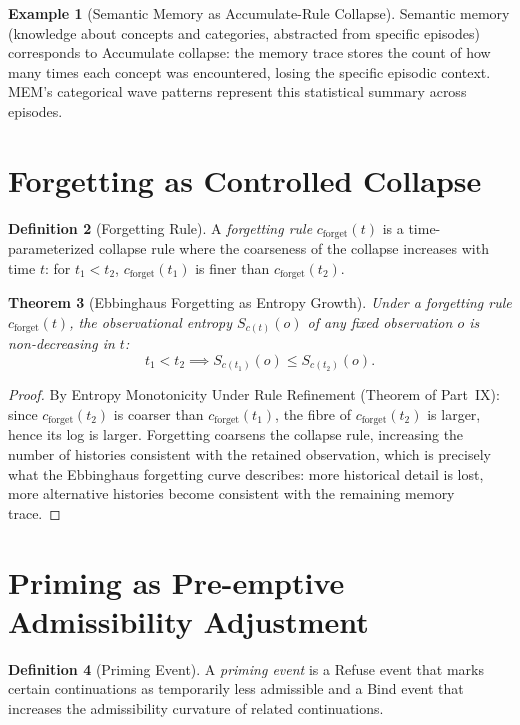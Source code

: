\documentclass[12pt, a4paper, openany]{book}
\theoremstyle{plain}
\newtheorem{theorem}{Theorem}[chapter]
\theoremstyle{definition}
\newtheorem{definition}[theorem]{Definition}
\newtheorem{example}[theorem]{Example}
\theoremstyle{remark}
\begin{document}
\begin{example}[Semantic Memory as Accumulate-Rule Collapse]
Semantic memory (knowledge about concepts and categories, abstracted from
specific episodes) corresponds to Accumulate collapse: the memory trace
stores the count of how many times each concept was encountered, losing the
specific episodic context. MEM's categorical wave patterns represent
this statistical summary across episodes.
\end{example}

\section{Forgetting as Controlled Collapse}

\begin{definition}[Forgetting Rule]
A \emph{forgetting rule} $c_{\mathrm{forget}}(t)$ is a time-parameterized
collapse rule where the coarseness of the collapse increases with time $t$:
for $t_1 < t_2$, $c_{\mathrm{forget}}(t_1)$ is finer than
$c_{\mathrm{forget}}(t_2)$.
\end{definition}

\begin{theorem}[Ebbinghaus Forgetting as Entropy Growth]
Under a forgetting rule $c_{\mathrm{forget}}(t)$, the observational entropy
$S_{c(t)}(o)$ of any fixed observation $o$ is non-decreasing in $t$:
\[
t_1 < t_2 \implies S_{c(t_1)}(o) \leq S_{c(t_2)}(o).
\]
\end{theorem}

\begin{proof}
By Entropy Monotonicity Under Rule Refinement (Theorem of Part~IX): since
$c_{\mathrm{forget}}(t_2)$ is coarser than $c_{\mathrm{forget}}(t_1)$, the
fibre of $c_{\mathrm{forget}}(t_2)$ is larger, hence its log is larger.
Forgetting coarsens the collapse rule, increasing the number of histories
consistent with the retained observation, which is precisely what the
Ebbinghaus forgetting curve describes: more historical detail is lost, more
alternative histories become consistent with the remaining memory trace.
\end{proof}

\section{Priming as Pre-emptive Admissibility Adjustment}

\begin{definition}[Priming Event]
A \emph{priming event} is a Refuse event that marks certain continuations as
temporarily less admissible and a Bind event that increases the admissibility
curvature of related continuations.
\end{definition}
\end{document}
